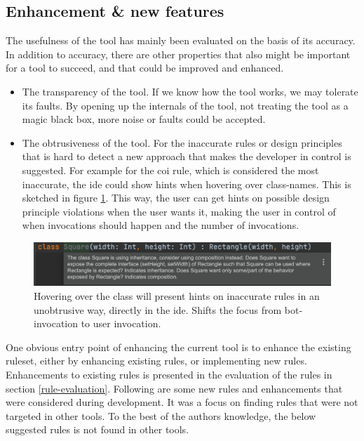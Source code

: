 \documentclass{report}
\begin{document}
\label{futurework}


\subsection*{Enhancement \& new features}

The usefulness of the tool has mainly been evaluated on the basis of its accuracy. In addition to accuracy, there are other properties that also might be important for a tool to succeed, and that could be improved and enhanced. 

\begin{itemize}
    \item The transparency of the tool. If we know how the tool works, we may tolerate its faults. By opening up the internals of the tool, not treating the tool as a magic black box, more noise or faults could be accepted.
    
    \item The obtrusiveness of the tool. For the inaccurate rules or design principles that is hard to detect a new approach that makes the developer in control is suggested. For example for the \gls{coi} rule, which is considered the most inaccurate, the \gls{ide} could show hints when hovering over class-names. This is sketched in figure \ref{fig:a-new-beginning}. This way, the user can get hints on possible design principle violations when the user wants it, making the user in control of when invocations should happen and the number of invocations.

\end{itemize}


\begin{figure}[h!]
    \centering
    \includegraphics[width=\linewidth]{report/a-new-beginning (2).png}
    \caption{Hovering over the class will present hints on inaccurate rules in an unobtrusive way, directly in the \gls{ide}. Shifts the focus from bot-invocation to user invocation.}
    \label{fig:a-new-beginning}
\end{figure}


One obvious entry point of enhancing the current tool is to enhance the existing ruleset, either by enhancing existing rules, or implementing new rules. Enhancements to existing rules is presented in the evaluation of the rules in section \ref{rule-evaluation}. Following are some new rules and enhancements that were considered during development. It was a focus on finding rules that were not targeted in other tools. To the best of the authors knowledge, the below suggested rules is not found in other tools. 
\end{document}
